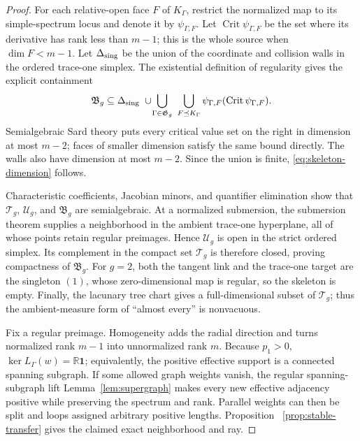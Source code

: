 \documentclass[11pt,reqno]{amsart}
\theoremstyle{definition}
\theoremstyle{remark}
\newcommand{\one}{\mathbf 1}
\newcommand{\R}{\mathbb R}
\newcommand{\Crit}{\operatorname{Crit}}
\begin{document}
\begin{proof}
For each relative-open face $F$ of $K_\Gamma$, restrict the normalized map to
its simple-spectrum locus and denote it by $\psi_{\Gamma,F}$.  Let
$\Crit\psi_{\Gamma,F}$ be the set where its derivative has rank less than
$m-1$; this is the whole source when $\dim F<m-1$.  Let
$\Delta_{\rm sing}$ be the union of the coordinate and collision walls in
the ordered trace-one simplex.  The existential definition of regularity
gives the explicit containment
\begin{equation}\label{eq:skeleton-critical-containment}
 \mathfrak B_g\subseteq
 \Delta_{\rm sing}\ \cup\!
 \bigcup_{\Gamma\in\mathfrak G_g}\ \bigcup_{F\preceq K_\Gamma}
 \psi_{\Gamma,F}(\Crit\psi_{\Gamma,F}).
\end{equation}
Semialgebraic Sard theory \cite{KurdykaOrroSimon2000} puts every critical
value set on the right in dimension at most $m-2$; faces of smaller
dimension satisfy the same bound directly.  The walls also have dimension
at most $m-2$.  Since the union is finite,
\eqref{eq:skeleton-dimension} follows.

Characteristic coefficients, Jacobian minors, and quantifier elimination
show that $\mathcal T_g$, $\mathcal U_g$, and $\mathfrak B_g$ are
semialgebraic.  At a normalized submersion, the submersion theorem supplies
a neighborhood in the ambient trace-one hyperplane, all of whose points
retain regular preimages.  Hence $\mathcal U_g$ is open in the strict ordered
simplex.  Its complement in the compact set $\mathcal T_g$ is therefore
closed, proving compactness of $\mathfrak B_g$.  For $g=2$, both the tangent
link and the trace-one target are the singleton $(1)$, whose zero-dimensional
map is regular, so the skeleton is empty.  Finally, the lacunary tree chart
gives a full-dimensional subset of $\mathcal T_g$; thus the ambient-measure
form of ``almost every'' is nonvacuous.

Fix a regular preimage.  Homogeneity adds the radial direction and turns
normalized rank $m-1$ into unnormalized rank $m$.  Because $p_1>0$,
$\ker L_\Gamma(w)=\R\one$; equivalently, the positive effective support is a
connected spanning subgraph.  If some allowed graph weights vanish, the
regular spanning-subgraph lift Lemma~\ref{lem:supergraph} makes every new
effective adjacency positive while preserving the spectrum and rank.
Parallel weights can then be split and loops assigned arbitrary positive
lengths.  Proposition~
\ref{prop:stable-transfer} gives the claimed exact neighborhood and ray.
\end{proof}
\end{document}
